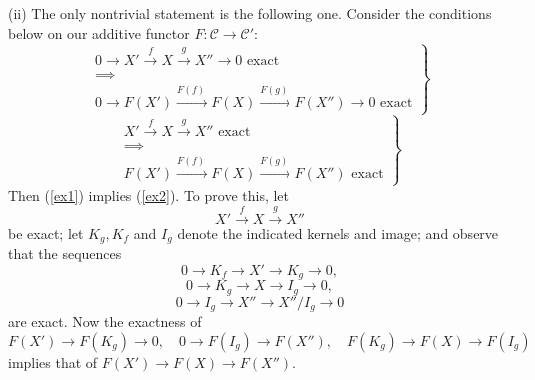\documentclass[12pt]{article}
\theoremstyle{remark}
\theoremstyle{definition}
\newcommand{\C}{\mathcal C}
\begin{document}
(ii) The only nontrivial statement is the following one. Consider the conditions below on our additive functor $F:\C\to\C'$: 
\begin{equation}\label{ex1}
\left.
\begin{matrix}
0\to X'\overset{f}{\to}X\overset{g}{\to}X''\to0\text{ exact }\\ 
\implies\\ 
0\to F(X')\overset{F(f)\ }{\longrightarrow}F(X)\overset{F(g)\ }{\longrightarrow}F(X'')\to0\text{ exact}
\end{matrix}
\right\}
\end{equation}
\begin{equation}\label{ex2}
\left.
\begin{matrix}
X'\overset{f}{\to}X\overset{g}{\to}X''\text{ exact }\\ 
\implies\\ 
F(X')\overset{F(f)\ }{\longrightarrow}F(X)\overset{F(g)\ }{\longrightarrow}F(X'')\text{ exact}
\end{matrix}
\right\}
\end{equation} 
Then (\ref{ex1}) implies (\ref{ex2}). To prove this, let 
$$
X'\overset{f}{\to}X\overset{g}{\to}X''
$$
be exact; let $K_g,K_f$ and $I_g$ denote the indicated kernels and image; and observe that the sequences 
$$
0\to K_f\to X'\to K_g\to 0,
$$
$$
0\to K_g\to X\to I_g\to 0,
$$
$$
0\to I_g\to X''\to X''/I_g\to 0
$$
are exact. Now the exactness of 
$$
F(X')\to F(K_g)\to0,\quad 0\to F(I_g)\to F(X''),\quad F(K_g)\to F(X)\to F(I_g)
$$
implies that of $F(X')\to F(X)\to F(X'')$.
%
%
\end{document}
